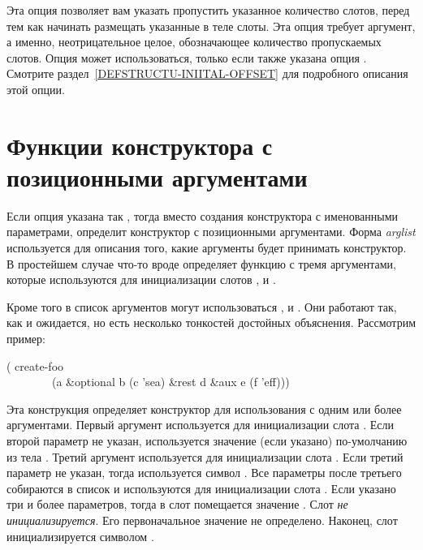 \begin{flushdesc}
\item[\cd{:initial-offset}]
Эта опция позволяет вам указать  пропустить указанное количество
слотов, перед тем как начинать размещать указанные в теле слоты. Эта опция
требует аргумент, а именно, неотрицательное целое, обозначающее количество
пропускаемых слотов.
Опция  может использоваться, только если также указана опция
.
Смотрите раздел~\ref{DEFSTRUCTU-INIITAL-OFFSET} для подробного описания этой
опции.
\end{flushdesc}

\section{Функции конструктора с позиционными аргументами}
\label{DEFSTRUCT-CONSTRUCTOR-SYNTAX}

Если опция  указана так , тогда вместо создания конструктора с именованными
параметрами,  определит конструктор с позиционными аргументами.
Форма \emph{arglist} используется для описания того, какие аргументы будет
принимать конструктор. В простейшем случае что-то вроде  определяет функцию  с тремя аргументами,
которые используются для инициализации слотов ,  и .

Кроме того в список аргументов могут использоваться , 
и . Они работают так, как и ожидается, но есть несколько тонкостей
достойных объяснения. Рассмотрим пример:
\begin{lisp}
( create-foo \\
~~~~~~~~(a \&optional b (c 'sea) \&rest d \&aux e (f 'eff)))
\end{lisp}
Эта конструкция определяет конструктор  для использования с
одним или более аргументами. Первый аргумент используется для инициализации
слота . Если второй параметр не указан, используется значение (если
указано) по-умолчанию из тела . Третий аргумент используется для
инициализации слота . Если третий параметр не указан, тогда используется
символ . Все параметры после третьего собираются в список и
используются для инициализации слота . Если указано три и более
параметров, тогда в слот  помещается значение {\false}. Слот 
\emph{не инициализируется}. Его первоначальное значение не определено. Наконец,
слот  инициализируется символом .

